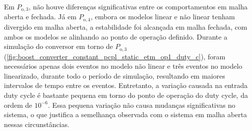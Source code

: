 Em $P_{\mathrm{o}, 3}$, não houve diferenças significativas entre os comportamentos em malha aberta e fechada. Já em $P_{\mathrm{o}, 4}$, embora os modelos linear e não linear tenham divergido em malha aberta, a estabilidade foi alcançada em malha fechada, com ambos os modelos se alinhando ao ponto de operação definido. Durante a simulação do conversor em torno de $P_{\mathrm{o}, 3}$ (\autoref{fig:boost_converter_constant_pcpl_static_etm_op1_duty_c}), foram necessários apenas dois eventos no modelo não linear e três eventos no modelo linearizado, durante todo o período de simulação, resultando em maiores intervalos de tempo entre os eventos. Entretanto, a variação causada na entrada duty cycle é bastante pequena em torno do ponto de operação do duty cycle, da ordem de $10^{-6}$. Essa pequena variação não causa mudanças significativas no sistema, o que justifica a semelhança observada com o sistema em malha aberta nessas circunstâncias.

